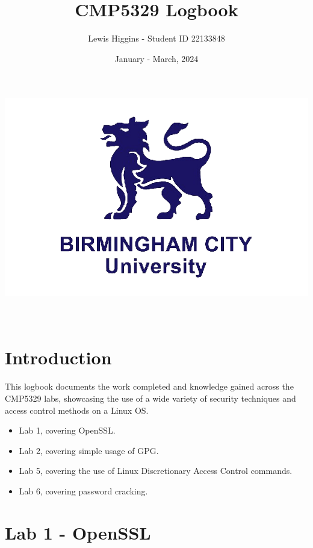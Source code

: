 \documentclass[12pt]{report}
\title{CMP5329 Logbook}
\author{Lewis Higgins - Student ID 22133848}
\date{January - March, 2024}
\begin{document}
    \makeatletter
    \begin{titlepage}
        \begin{center}
            \includegraphics[width=0.7\linewidth]{bcu logo}\\[4ex]
            {\huge \bfseries  \@title }\\[2ex]
            {\@author}\\[50ex]
            {\large \@date}
        \end{center}
    \end{titlepage}
    \makeatother
    \thispagestyle{empty}
    \newpage


    \tableofcontents
    \chapter*{Introduction}\label{ch:introduction}

    This logbook documents the work completed and knowledge gained across the CMP5329 labs, showcasing
    the use of a wide variety of security techniques and access control methods on a Linux OS\@.
    \begin{itemize}
        \item Lab 1, covering OpenSSL\@.
        \item Lab 2, covering simple usage of GPG\@.
        \item Lab 5, covering the use of Linux Discretionary Access Control commands.
        \item Lab 6, covering password cracking.
    \end{itemize}
    \newline



    \chapter{Lab 1 - OpenSSL}\label{ch:lab1}
    
\end{document}
